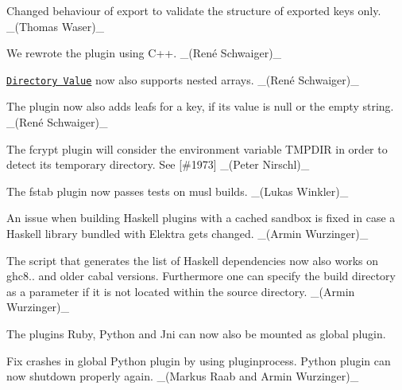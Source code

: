 \begin{DoxyItemize}
\item Changed behaviour of export to validate the structure of exported keys only. \+\_\+(\+Thomas Waser)\+\_\+
\end{DoxyItemize}


\begin{DoxyItemize}
\item We rewrote the plugin using C++. \+\_\+(René Schwaiger)\+\_\+
\item \href{https://www.libelektra.org/plugins/directoryvalue}{\tt Directory Value} now also supports nested arrays. \+\_\+(René Schwaiger)\+\_\+
\item The plugin now also adds leafs for a key, if its value is null or the empty string. \+\_\+(René Schwaiger)\+\_\+
\end{DoxyItemize}


\begin{DoxyItemize}
\item The {\ttfamily fcrypt} plugin will consider the environment variable {\ttfamily T\+M\+P\+D\+IR} in order to detect its temporary directory. See \mbox{[}\#1973\mbox{]} \+\_\+(\+Peter Nirschl)\+\_\+
\end{DoxyItemize}


\begin{DoxyItemize}
\item The {\ttfamily fstab} plugin now passes tests on musl builds. \+\_\+(\+Lukas Winkler)\+\_\+
\end{DoxyItemize}


\begin{DoxyItemize}
\item An issue when building Haskell plugins with a cached sandbox is fixed in case a Haskell library bundled with Elektra gets changed. \+\_\+(\+Armin Wurzinger)\+\_\+
\item The script that generates the list of Haskell dependencies now also works on ghc8.. and older cabal versions. Furthermore one can specify the build directory as a parameter if it is not located within the source directory. \+\_\+(\+Armin Wurzinger)\+\_\+
\end{DoxyItemize}


\begin{DoxyItemize}
\item The plugins Ruby, Python and Jni can now also be mounted as global plugin.
\item Fix crashes in global Python plugin by using pluginprocess. Python plugin can now shutdown properly again. \+\_\+(\+Markus Raab and Armin Wurzinger)\+\_\+
\end{DoxyItemize}



